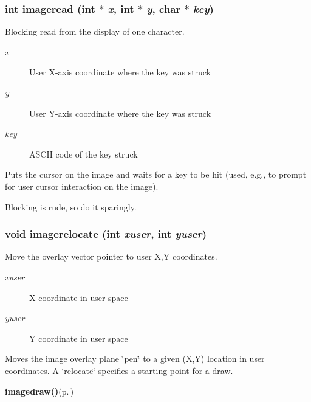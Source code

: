 \subsubsection{\setlength{\rightskip}{0pt plus 5cm}int imageread (int $\ast$ {\em x}, int $\ast$ {\em y}, char $\ast$ {\em key})}\label{xtv_8h_a82}


Blocking read from the display of one character. 

\begin{Desc}
\item[Parameters:]
\begin{description}
\item[{\em x}]User X-axis coordinate where the key was struck \item[{\em y}]User Y-axis coordinate where the key was struck \item[{\em key}]ASCII code of the key struck\end{description}
\end{Desc}
Puts the cursor on the image and waits for a key to be hit (used, e.g., to prompt for user cursor interaction on the image).

Blocking is rude, so do it sparingly. 
\subsubsection{\setlength{\rightskip}{0pt plus 5cm}void imagerelocate (int {\em xuser}, int {\em yuser})}\label{xtv_8h_a72}


Move the overlay vector pointer to user X,Y coordinates. 

\begin{Desc}
\item[Parameters:]
\begin{description}
\item[{\em xuser}]X coordinate in user space \item[{\em yuser}]Y coordinate in user space\end{description}
\end{Desc}
Moves the image overlay plane \char`\"{}pen\char`\"{} to a given (X,Y) location in user coordinates. A \char`\"{}relocate\char`\"{} specifies a starting point for a draw.

\begin{Desc}
\item[See also:]{\bf imagedraw()}{\rm (p.\,\pageref{xtv_8h_a73})} \end{Desc}
